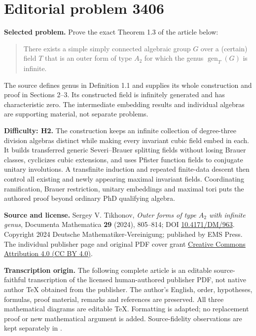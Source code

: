 \documentclass[10pt]{article}
\theoremstyle{definition}
\DeclareMathOperator{\gen}{gen}
\begin{document}
\section*{Editorial problem 3406}
\noindent\textbf{Selected problem.} Prove the exact Theorem 1.3 of the article below:
\begin{quote}
There exists a simple simply connected algebraic group $G$ over a (certain) field $T$ that is an outer form of type $A_2$ for which the genus $\gen_T(G)$ is infinite.
\end{quote}
The source defines genus in Definition 1.1 and supplies its whole construction and proof in Sections 2--3. Its constructed field is infinitely generated and has characteristic zero. The intermediate embedding results and individual algebras are supporting material, not separate problems.

\noindent\textbf{Difficulty: H2.} The construction keeps an infinite collection of degree-three division algebras distinct while making every invariant cubic field embed in each. It builds transferred generic Severi--Brauer splitting fields without losing Brauer classes, cyclicizes cubic extensions, and uses Pfister function fields to conjugate unitary involutions. A transfinite induction and repeated finite-data descent then control all existing and newly appearing maximal invariant fields. Coordinating ramification, Brauer restriction, unitary embeddings and maximal tori puts the authored proof beyond ordinary PhD qualifying algebra.

\noindent\textbf{Source and license.} Sergey V. Tikhonov, \textit{Outer forms of type $A_2$ with infinite genus}, Documenta Mathematica \textbf{29} (2024), 805--814; DOI \href{https://doi.org/10.4171/DM/963}{10.4171/DM/963}. Copyright 2024 Deutsche Mathematiker-Vereinigung; published by EMS Press. The individual publisher page and original PDF cover grant \href{https://creativecommons.org/licenses/by/4.0/}{Creative Commons Attribution 4.0 (CC BY 4.0)}.

\noindent\textbf{Transcription origin.} The following complete article is an editable source-faithful transcription of the licensed human-authored publisher PDF, not native author TeX obtained from the publisher. The author's English, order, hypotheses, formulas, proof material, remarks and references are preserved. All three mathematical diagrams are editable TeX. Formatting is adapted; no replacement proof or new mathematical argument is added. Source-fidelity observations are kept separately in .
\end{document}
